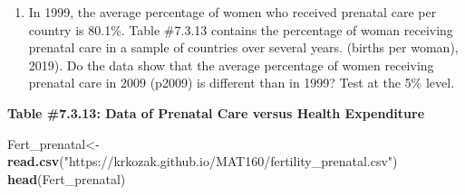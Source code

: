 \documentclass[]{book}
\newenvironment{Shaded}{\begin{snugshade}}{\end{snugshade}}
\newcommand{\KeywordTok}[1]{\textcolor[rgb]{0.13,0.29,0.53}{\textbf{#1}}}
\newcommand{\NormalTok}[1]{#1}
\newcommand{\StringTok}[1]{\textcolor[rgb]{0.31,0.60,0.02}{#1}}
\providecommand{\tightlist}{%
  \setlength{\itemsep}{0pt}\setlength{\parskip}{0pt}}
\begin{document}
\begin{enumerate}
\def\labelenumi{\arabic{enumi}.}
\setcounter{enumi}{5}
\tightlist
\item
  In 1999, the average percentage of women who received prenatal care per country is 80.1\%. Table \#7.3.13 contains the percentage of woman receiving prenatal care in a sample of countries over several years. (births per woman), 2019). Do the data show that the average percentage of women receiving prenatal care in 2009 (p2009) is different than in 1999? Test at the 5\% level.
\end{enumerate}

\textbf{Table \#7.3.13: Data of Prenatal Care versus Health Expenditure}

\begin{Shaded}
\begin{Highlighting}[]
\NormalTok{Fert_prenatal<-}\StringTok{ }\KeywordTok{read.csv}\NormalTok{(}\StringTok{"https://krkozak.github.io/MAT160/fertility_prenatal.csv"}\NormalTok{)}
\KeywordTok{head}\NormalTok{(Fert_prenatal)}
\end{Highlighting}
\end{Shaded}
\end{document}
